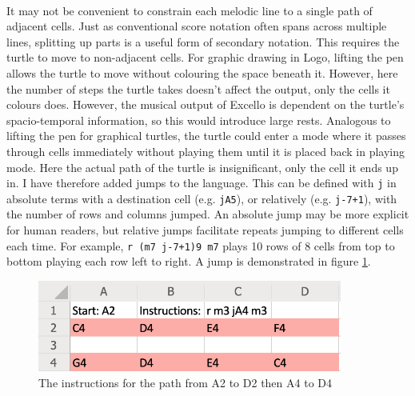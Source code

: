 \paragraph{} It may not be convenient to constrain each melodic line to a single path of adjacent cells. Just as conventional score notation often spans across multiple lines, splitting up parts is a useful form of secondary notation. This requires the turtle to move to non-adjacent cells. For graphic drawing in Logo, lifting the pen allows the turtle to move without colouring the space beneath it. However, here the number of steps the turtle takes doesn't affect the output, only the cells it colours does. However, the musical output of Excello is dependent on the turtle's spacio-temporal information, so this would introduce large rests. Analogous to lifting the pen for graphical turtles, the turtle could enter a mode where it passes through cells immediately without playing them until it is placed back in playing mode. Here the actual path of the turtle is insignificant, only the cell it ends up in. I have therefore added jumps to the language. This can be defined with \texttt{j} in absolute terms with a destination cell (e.g. \texttt{jA5}), or relatively (e.g. \texttt{j-7+1}), with the number of rows and columns jumped. An absolute jump may be more explicit for human readers, but relative jumps facilitate repeats jumping to different cells each time. For example, \texttt{r (m7 j-7+1)9 m7} plays 10 rows of 8 cells from top to bottom playing each row left to right. A jump is demonstrated in figure \ref{prep:language2}.

\begin{figure}[ht]
  \centerline{\includegraphics[width=100mm]{figs/diss2.png}}
\caption{The instructions for the path from A2 to D2 then A4 to D4}
\label{prep:language2}
\end{figure}
\vspace{-20pt}

